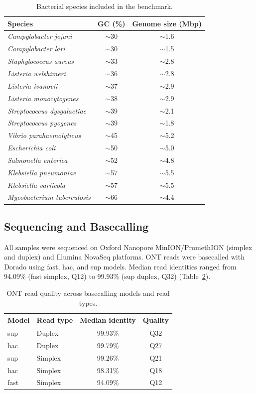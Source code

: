 \documentclass[11pt]{article}
\begin{document}
\begin{table}[h]
\centering
\caption{Bacterial species included in the benchmark.}
\label{tab:species}
\small
\begin{tabular}{lcc}
\toprule
Species & GC (\%) & Genome size (Mbp) \\
\midrule
\textit{Campylobacter jejuni} & $\sim$30 & $\sim$1.6 \\
\textit{Campylobacter lari} & $\sim$30 & $\sim$1.5 \\
\textit{Staphylococcus aureus} & $\sim$33 & $\sim$2.8 \\
\textit{Listeria welshimeri} & $\sim$36 & $\sim$2.8 \\
\textit{Listeria ivanovii} & $\sim$37 & $\sim$2.9 \\
\textit{Listeria monocytogenes} & $\sim$38 & $\sim$2.9 \\
\textit{Streptococcus dysgalactiae} & $\sim$39 & $\sim$2.1 \\
\textit{Streptococcus pyogenes} & $\sim$39 & $\sim$1.8 \\
\textit{Vibrio parahaemolyticus} & $\sim$45 & $\sim$5.2 \\
\textit{Escherichia coli} & $\sim$50 & $\sim$5.0 \\
\textit{Salmonella enterica} & $\sim$52 & $\sim$4.8 \\
\textit{Klebsiella pneumoniae} & $\sim$57 & $\sim$5.5 \\
\textit{Klebsiella variicola} & $\sim$57 & $\sim$5.5 \\
\textit{Mycobacterium tuberculosis} & $\sim$66 & $\sim$4.4 \\
\bottomrule
\end{tabular}
\end{table}

\subsection{Sequencing and Basecalling}

All samples were sequenced on Oxford Nanopore MinION/PromethION (simplex and duplex) and Illumina NovaSeq platforms. ONT reads were basecalled with Dorado using fast, hac, and sup models. Median read identities ranged from 94.09\% (fast simplex, Q12) to 99.93\% (sup duplex, Q32) (Table~\ref{tab:readquality}).

\begin{table}[h]
\centering
\caption{ONT read quality across basecalling models and read types.}
\label{tab:readquality}
\begin{tabular}{llcc}
\toprule
Model & Read type & Median identity & Quality \\
\midrule
sup & Duplex & 99.93\% & Q32 \\
hac & Duplex & 99.79\% & Q27 \\
sup & Simplex & 99.26\% & Q21 \\
hac & Simplex & 98.31\% & Q18 \\
fast & Simplex & 94.09\% & Q12 \\
\bottomrule
\end{tabular}
\end{table}
\end{document}
